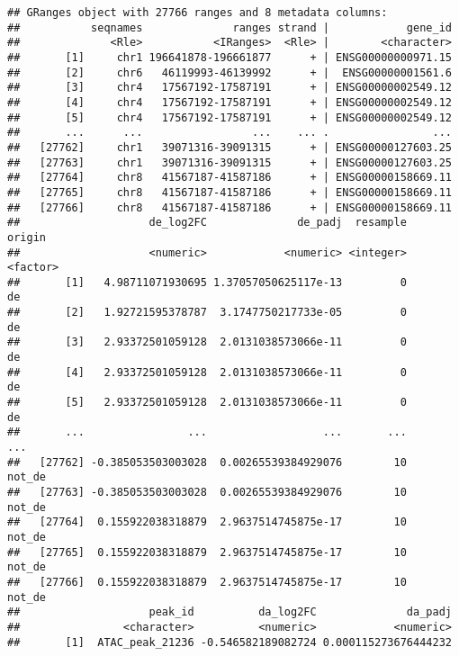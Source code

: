 \documentclass[
]{article}
\newenvironment{Shaded}{}{}
\newcommand{\KeywordTok}[1]{\textcolor[rgb]{0.00,0.44,0.13}{\textbf{#1}}}
\newcommand{\NormalTok}[1]{#1}
\newcommand{\OperatorTok}[1]{\textcolor[rgb]{0.40,0.40,0.40}{#1}}
\newcommand{\StringTok}[1]{\textcolor[rgb]{0.25,0.44,0.63}{#1}}
\begin{document}
\begin{Shaded}
\end{Shaded}

\begin{verbatim}
## GRanges object with 27766 ranges and 8 metadata columns:
##           seqnames              ranges strand |            gene_id
##              <Rle>           <IRanges>  <Rle> |        <character>
##       [1]     chr1 196641878-196661877      + | ENSG00000000971.15
##       [2]     chr6   46119993-46139992      + |  ENSG00000001561.6
##       [3]     chr4   17567192-17587191      + | ENSG00000002549.12
##       [4]     chr4   17567192-17587191      + | ENSG00000002549.12
##       [5]     chr4   17567192-17587191      + | ENSG00000002549.12
##       ...      ...                 ...    ... .                ...
##   [27762]     chr1   39071316-39091315      + | ENSG00000127603.25
##   [27763]     chr1   39071316-39091315      + | ENSG00000127603.25
##   [27764]     chr8   41567187-41587186      + | ENSG00000158669.11
##   [27765]     chr8   41567187-41587186      + | ENSG00000158669.11
##   [27766]     chr8   41567187-41587186      + | ENSG00000158669.11
##                    de_log2FC              de_padj  resample   origin
##                    <numeric>            <numeric> <integer> <factor>
##       [1]   4.98711071930695 1.37057050625117e-13         0       de
##       [2]   1.92721595378787  3.1747750217733e-05         0       de
##       [3]   2.93372501059128  2.0131038573066e-11         0       de
##       [4]   2.93372501059128  2.0131038573066e-11         0       de
##       [5]   2.93372501059128  2.0131038573066e-11         0       de
##       ...                ...                  ...       ...      ...
##   [27762] -0.385053503003028  0.00265539384929076        10   not_de
##   [27763] -0.385053503003028  0.00265539384929076        10   not_de
##   [27764]  0.155922038318879  2.9637514745875e-17        10   not_de
##   [27765]  0.155922038318879  2.9637514745875e-17        10   not_de
##   [27766]  0.155922038318879  2.9637514745875e-17        10   not_de
##                    peak_id          da_log2FC              da_padj
##                <character>          <numeric>            <numeric>
##       [1]  ATAC_peak_21236 -0.546582189082724 0.000115273676444232

\end{verbatim}
\end{document}
